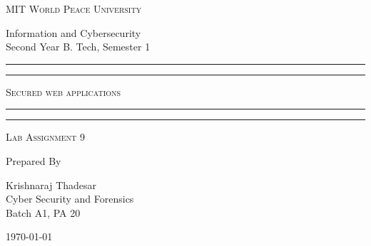\documentclass[11pt]{article}
\begin{document}
\begin{titlepage}
    \centering


    \huge\textsc{
        MIT World Peace University
    }\\

    \vspace{0.75\baselineskip} %

    \LARGE{
        Information and Cybersecurity\\
        Second Year B. Tech, Semester 1
    }

    \vfill %


    \rule{\textwidth}{1.6pt}\vspace*{-\baselineskip}\vspace*{2pt}
    \rule{\textwidth}{0.6pt}
    \vspace{0.75\baselineskip} %



    \huge{\textsc{
            Secured web applications
        }} \\



    \vspace{0.5\baselineskip} %
    \rule{\textwidth}{0.6pt}\vspace*{-\baselineskip}\vspace*{2.8pt}
    \rule{\textwidth}{1.6pt}

    \vspace{1\baselineskip} %


    \LARGE\textsc{
        Lab Assignment 9
    } %
    \vfill


    Prepared By
    \vspace{0.5\baselineskip} %

    \Large{
        Krishnaraj Thadesar \\
        Cyber Security and Forensics\\
        Batch A1, PA 20
    }


    \vspace{0.5\baselineskip} %
    \today

\end{titlepage}
\end{document}
